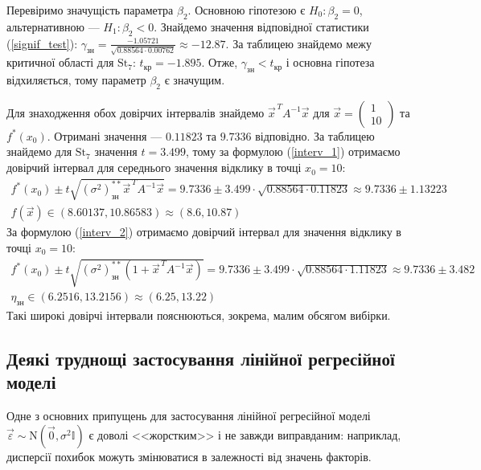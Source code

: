 Перевіримо значущість параметра $\beta_2$. Основною гіпотезою є $H_0 : \beta_2 = 0$,
альтернативною --- $H_1 : \beta_2 < 0$. Знайдемо значення відповідної статистики
(\ref{signif_test}): $\gamma_\text{зн} = \frac{
    -1.05721
}{
    \sqrt{0.88564 \cdot 0.00762}
} \approx - 12.87$. 
За таблицею знайдемо межу критичної області для $\mathrm{St}_7$: $t_\text{кр} = -1.895$.
Отже, $\gamma_\text{зн} < t_\text{кр}$ і основна гіпотеза відхиляється, тому параметр $\beta_2$ є значущим.

Для знаходження обох довірчих інтервалів знайдемо 
$\vec{x}^{\, T} A^{-1} \vec{x}$ для $\vec{x} = \begin{pmatrix}
    1 \\ 10
\end{pmatrix}$ та $f^*(x_0)$. Отримані значення --- $0.11823$ та $9.7336$ відповідно.
За таблицею знайдемо для $\mathrm{St}_7$ значення $t = 3.499$, тому за формулою
(\ref{interv_1}) отримаємо довірчий інтервал для середнього значення відклику в точці $x_0 = 10$:
\begin{gather*}
    f^*(x_0) \pm t \sqrt{(\sigma^2)^{**}_{\text{зн}} \vec{x}^{\, T} A^{-1} \vec{x}} =
    9.7336 \pm 3.499\cdot\sqrt{0.88564 \cdot 0.11823} \approx 9.7336 \pm 1.13223 \\
    f(\vec{x}) \in 
    \left(
        8.60137, 
        10.86583
    \right) \approx \left(8.6, 10.87\right)
\end{gather*}
За формулою (\ref{interv_2}) отримаємо довірчий інтервал для значення відклику в точці $x_0 = 10$:
\begin{gather*}
    f^*(x_0) \pm t \sqrt{(\sigma^2)^{**}_{\text{зн}}\left(1 + \vec{x}^{\, T} A^{-1} \vec{x}\right)} = 
    9.7336 \pm 3.499\cdot\sqrt{0.88564 \cdot 1.11823} \approx 9.7336 \pm 3.482 \\
    \eta_\text{зн} \in \left(6.2516, 13.2156\right) \approx \left(6.25, 13.22\right)
\end{gather*}
Такі широкі довірчі інтервали пояснюються, зокрема, малим обсягом вибірки.

\subsection{Деякі труднощі застосування лінійної регресійної моделі}
Одне з основних припущень для застосування лінійної регресійної моделі $\vec{\varepsilon} \sim \mathrm{N}(\vec{0}, \sigma^2 \mathbb{I})$ є доволі
<<жорстким>> і не завжди виправданим: наприклад, дисперсії похибок можуть змінюватися в залежності від значень факторів.

